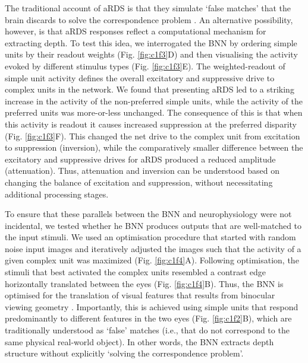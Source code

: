 {The traditional account of aRDS is that they simulate `false matches' that the brain discards to solve the correspondence problem \cite{Tanabe:2004mw,Janssen:2003fk}. An alternative possibility, however, is that aRDS responses reflect a computational mechanism for extracting depth. To test this idea, we interrogated the BNN by ordering simple units by their readout weights (Fig. \ref{fig:c1f3}D) and then visualising the activity evoked by different stimulus types (Fig. \ref{fig:c1f3}E). The weighted-readout of simple unit activity defines the overall excitatory and suppressive drive to complex units in the network. We found that presenting aRDS led to a striking increase in the activity of the non-preferred simple units, while the activity of the preferred units was more-or-less unchanged. The consequence of this is that when this activity is readout it causes increased suppression at the preferred disparity (Fig. \ref{fig:c1f3}F). This changed the net drive to the complex unit from excitation to suppression (inversion), while the comparatively smaller difference between the excitatory and suppressive drives for aRDS produced a reduced amplitude (attenuation). Thus, attenuation and inversion can be understood based on changing the balance of excitation and suppression, without necessitating additional processing stages. 


To ensure that these parallels between the BNN and neurophysiology were not incidental, we tested whether he BNN produces outputs that are well-matched to the input stimuli. We used an optimisation procedure that started with random noise input images and iteratively adjusted the images such that the activity of a given complex unit was maximized (Fig. \ref{fig:c1f4}A). Following optimisation, the stimuli that best activated the complex units resembled a contrast edge horizontally translated between the eyes (Fig. \ref{fig:c1f4}B). Thus, the BNN is optimised for the translation of visual features that results from binocular viewing geometry \cite{Wheatstone:1838xf}. Importantly, this is achieved using simple units that respond predominantly to different features in the two eyes (Fig. \ref{fig:c1f2}B), which are traditionally understood as `false' matches (i.e., that do not correspond to the same physical real-world object). In other words, the BNN extracts depth structure without explicitly `solving the correspondence problem'. 

}
